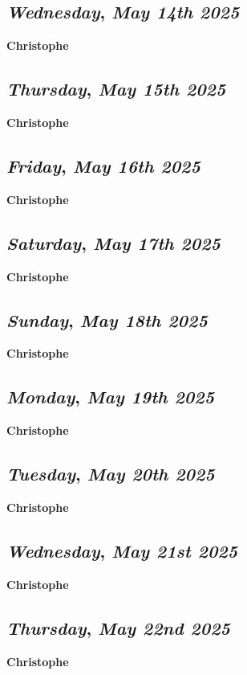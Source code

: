 \def\day{\textit{May 14th 2025}}
\def\weekday{\textit{Wednesday}}
\subsection*{\weekday, \day}
\textbf {Christophe}

\def\day{\textit{May 15th 2025}}
\def\weekday{\textit{Thursday}}
\subsection*{\weekday, \day}
\textbf {Christophe}

\def\day{\textit{May 16th 2025}}
\def\weekday{\textit{Friday}}
\subsection*{\weekday, \day}
\textbf {Christophe}

\def\day{\textit{May 17th 2025}}
\def\weekday{\textit{Saturday}}
\subsection*{\weekday, \day}
\textbf {Christophe}

\def\day{\textit{May 18th 2025}}
\def\weekday{\textit{Sunday}}
\subsection*{\weekday, \day}
\textbf {Christophe}

\def\day{\textit{May 19th 2025}}
\def\weekday{\textit{Monday}}
\subsection*{\weekday, \day}
\textbf {Christophe}

\def\day{\textit{May 20th 2025}}
\def\weekday{\textit{Tuesday}}
\subsection*{\weekday, \day}
\textbf {Christophe}

\def\day{\textit{May 21st 2025}}
\def\weekday{\textit{Wednesday}}
\subsection*{\weekday, \day}
\textbf {Christophe}

\def\day{\textit{May 22nd 2025}}
\def\weekday{\textit{Thursday}}
\subsection*{\weekday, \day}
\textbf {Christophe}

